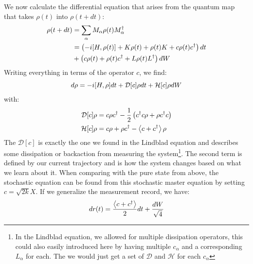 
We now calculate the differential equation that arises from the quantum map that takes $\rho(t)$ into $\rho(t+dt)$:
\begin{align}
    \rho(t+dt) &= \sum_\alpha M_\alpha \rho(t) M_\alpha^\dagger \\
               &= \left(-i \comm{H}{\rho(t)} + K\rho(t) + \rho(t)K + c\rho(t)c^\dagger \right) dt \\
            &+\left(c\rho(t) + \rho(t)c^\dagger  + L\rho(t) L^\dagger \right)dW 
\end{align}
Writing everything in terms of the operator $c$, we find:
\begin{equation}
    d\rho = -i \comm{H}{\rho}dt + \mathcal{D}[c]\rho dt + \mathcal{H}[c] \rho dW
\end{equation}
with:
\begin{align}
    \mathcal{D}[c] \rho &= c\rho c^\dagger - \frac12 \left(c^\dagger c \rho + \rho c^\dagger c\right) \\ 
    \mathcal{H}[c] \rho &= c\rho + \rho c^\dagger - \expval{c + c^\dagger}\rho
\end{align}
The $\mathcal{D}[c]$ is exactly the one we found in the Lindblad equation and describes some dissipation or backaction from measuring the system\footnote{In the Lindblad equation, we allowed for multiple dissipation operators, this could also easily introduced here by having multiple $c_\alpha$ and a corresponding $L_\alpha$ for each. The we would just get a set of $\mathcal{D}$ and $\mathcal{H}$ for each $c_\alpha$}. The second term is defined by our current trajectory and is how the system changes based on what we learn about it. When comparing with the pure state from above, the stochastic equation can be found from this stochastic master equation by setting $c = \sqrt{2k}X$. If we generalize the measurement record, we have:
\begin{equation}
    dr(t) = \frac{\expval{c + c^\dagger}}{2}dt + \frac{dW}{\sqrt{4}}
\end{equation}

